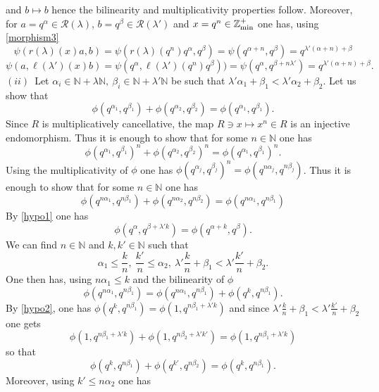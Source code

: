 \documentclass[noams,lp]{compositio}
\def\N{{\mathbb N}}
\def\Z{{\mathbb Z}}
\def\cR{{\mathcal R}}
\def\zminp{\Z_{\rm min}^+}
\begin{document}
and $b\mapsto b$ hence the bilinearity and multiplicativity properties follow. Moreover, for $a=q^\alpha\in \cR(\lambda)$, $b=q^\beta\in \cR(\lambda')$ and $x= q^n\in \zminp$ one has, using \eqref{morphism3}
$$
\psi(r(\lambda)(x)a,b)=\psi(r(\lambda)(q^n)q^\alpha,q^\beta)=\psi(q^{\alpha+n},q^\beta)=q^{\lambda'(\alpha+n)+\beta}
$$
$$
\psi(a,\ell(\lambda')(x)b)=\psi(q^\alpha,\ell(\lambda')(q^n)q^\beta))=\psi(q^\alpha,q^{\beta+n\lambda'})=q^{\lambda'(\alpha+n)+\beta}.
$$
$(ii)$~Let $\alpha_i\in \N+\lambda \N, \   \beta_i\in \N+\lambda' \N$ be such that $\lambda'\alpha_1+\beta_1<\lambda'\alpha_2+\beta_2$. Let us show that 
\begin{equation}\label{simprule2}
\phi(q^{\alpha_1}, q^{\beta_1})+\phi(q^{\alpha_2}, q^{\beta_2})=\phi(q^{\alpha_1}, q^{\beta_1}).
\end{equation}
Since $R$ is multiplicatively cancellative, the map $R\ni x\mapsto x^n\in R$ is an injective endomorphism. Thus  it is enough to show that for some $n\in \N$ one has 
\begin{equation}\label{simprule3}
\phi(q^{\alpha_1}, q^{\beta_1})^n+\phi(q^{\alpha_2}, q^{\beta_2})^n=\phi(q^{\alpha_1}, q^{\beta_1})^n.
\end{equation}
Using the multiplicativity of $\phi$ one has $\phi(q^{\alpha_j}, q^{\beta_j})^n=\phi(q^{n\alpha_j}, q^{n\beta_j})$. Thus it is enough to show that for some $n\in \N$ one has 
\begin{equation}\label{simprule4}
\phi(q^{n\alpha_1}, q^{n\beta_1}) +\phi(q^{n\alpha_2}, q^{n\beta_2}) =\phi(q^{n\alpha_1}, q^{n\beta_1})
\end{equation}
By \eqref{hypo1} one has 
\begin{equation}\label{hypo2}
\phi(q^{\alpha}, q^{\beta+\lambda' k})=\phi(q^{\alpha+ k}, q^{\beta}).
\end{equation}
We can find $n\in\N$  and $k,k'\in \N$ such that 
$$
\alpha_1 \leq \frac kn, \  \frac{ k'}{n}\leq \alpha_2, \ \lambda'\frac kn+\beta_1< \lambda'\frac{ k'}{n}+\beta_2.
$$
One then has, using $n\alpha_1\leq k$ and the bilinearity of $\phi$
$$
\phi(q^{n\alpha_1}, q^{n\beta_1})=\phi(q^{n\alpha_1}, q^{n\beta_1})+\phi(q^{k}, q^{n\beta_1}).
$$
By \eqref{hypo2}, one has  $\phi(q^{k}, q^{n\beta_1})=\phi(1,q^{n\beta_1+\lambda'k})$ and since $\lambda'\frac kn+\beta_1< \lambda'\frac{ k'}{n}+\beta_2$ one gets
$$
\phi(1,q^{n\beta_1+\lambda'k})+\phi(1,q^{n\beta_2+\lambda'k'})=\phi(1,q^{n\beta_1+\lambda'k})
$$
so that 
$$
\phi(q^{k}, q^{n\beta_1})+\phi(q^{k'}, q^{n\beta_2})=\phi(q^{k}, q^{n\beta_1}).
$$
Moreover, using $k'\leq n\alpha_2$ one has 
\end{document}
